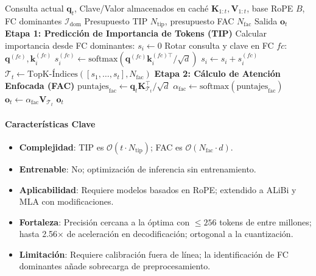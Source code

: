 \begin{algorithm}[H]
\caption{FASA: Atención Dispersa Consciente de la Frecuencia (en Tiempo de Inferencia)}
\begin{algorithmic}[1]
\Require Consulta actual $\mathbf{q}_t$, Clave/Valor almacenados en caché $\mathbf{K}_{1:t}, \mathbf{V}_{1:t}$, base RoPE $B$, FC dominantes $\mathcal{I}_{\text{dom}}$
\Require Presupuesto TIP $N_{\text{tip}}$, presupuesto FAC $N_{\text{fac}}$
\Ensure Salida $\mathbf{o}_t$
\State \textbf{Etapa 1: Predicción de Importancia de Tokens (TIP)}
        \State Calcular importancia desde FC dominantes: $s_i \gets 0$
            \State Rotar consulta y clave en FC $fc$: $\mathbf{q}^{(fc)}, \mathbf{k}_i^{(fc)}$
            \State $s_i^{(fc)} \gets \text{softmax}(\mathbf{q}^{(fc)} \mathbf{k}_i^{(fc)\top} / \sqrt{d}) $
            \State $s_i \gets s_i + s_i^{(fc)}$
        \EndFor
    \EndFor
    \State $\mathcal{T}_t \gets \mathrm{TopK}\text{-Índices}([s_1, \ldots, s_t], N_{\text{fac}})$ 
\EndFor
\State \textbf{Etapa 2: Cálculo de Atención Enfocada (FAC)}
\State $\text{puntajes}_{\text{fac}} \gets \mathbf{q}_t \mathbf{K}_{\mathcal{T}_t}^\top / \sqrt{d}$ 
\State $\alpha_{\text{fac}} \gets \text{softmax}(\text{puntajes}_{\text{fac}})$ 
\State $\mathbf{o}_t \gets \alpha_{\text{fac}} \mathbf{V}_{\mathcal{T}_t}$ 
\Return $\mathbf{o}_t$
\end{algorithmic}
\end{algorithm}

\paragraph{Características Clave}

\begin{itemize}[leftmargin=*]
    \item \textbf{Complejidad}: TIP es $\mathcal{O}(t \cdot N_{\text{tip}})$; FAC es $\mathcal{O}(N_{\text{fac}} \cdot d)$.
    \item \textbf{Entrenable}: No; optimización de inferencia sin entrenamiento.
    \item \textbf{Aplicabilidad}: Requiere modelos basados en RoPE; extendido a ALiBi y MLA con modificaciones.
    \item \textbf{Fortaleza}: Precisión cercana a la óptima con $\leq 256$ tokens de entre millones; hasta 2.56$\times$ de aceleración en decodificación; ortogonal a la cuantización.
    \item \textbf{Limitación}: Requiere calibración fuera de línea; la identificación de FC dominantes añade sobrecarga de preprocesamiento.
\end{itemize}

